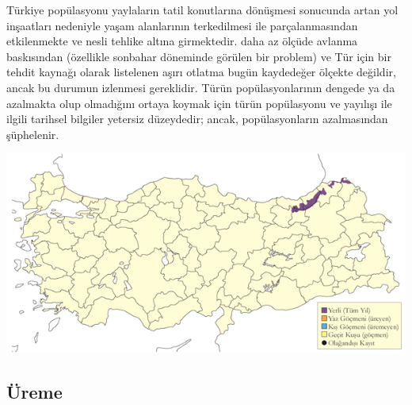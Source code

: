 \documentclass[
  letterpaper,
  DIV=11,
  numbers=noendperiod]{scrreprt}
\begin{document}
Türkiye popülasyonu yaylaların tatil konutlarına dönüşmesi sonucunda
artan yol inşaatları nedeniyle yaşam alanlarının terkedilmesi ile
parçalanmasından etkilenmekte ve nesli tehlike altına girmektedir. daha
az ölçüde avlanma baskısından (özellikle sonbahar döneminde görülen bir
problem) ve Tür için bir tehdit kaynağı olarak listelenen aşırı otlatma
bugün kaydedeğer ölçekte değildir, ancak bu durumun izlenmesi
gereklidir. Türün popülasyonlarının dengede ya da azalmakta olup
olmadığını ortaya koymak için türün popülasyonu ve yayılışı ile ilgili
tarihsel bilgiler yetersiz düzeydedir; ancak, popülasyonların
azalmasından şüphelenir.

\includegraphics{images/harita_Page_037.png}

\hypertarget{uxfcreme-36}{%
\subsection{\texorpdfstring{\textbf{Üreme}}{Üreme}}\label{uxfcreme-36}}
\end{document}
